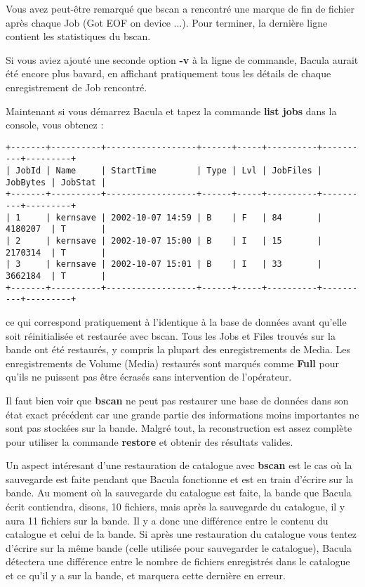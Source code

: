 Vous avez peut-être remarqué que bscan a rencontré une marque de fin de fichier
après chaque Job (Got EOF on device ...). Pour terminer, la dernière ligne 
contient les statistiques du bscan.

Si vous aviez ajouté une seconde option {\bf -v} à la ligne de commande, Bacula 
aurait été encore plus bavard, en affichant pratiquement tous les détails de
chaque enregistrement de Job rencontré.

Maintenant si vous démarrez Bacula et tapez la commande {\bf list jobs} dans la
console, vous obtenez :

\footnotesize
\begin{verbatim}
+-------+----------+------------------+------+-----+----------+----------+---------+
| JobId | Name     | StartTime        | Type | Lvl | JobFiles | JobBytes | JobStat |
+-------+----------+------------------+------+-----+----------+----------+---------+
| 1     | kernsave | 2002-10-07 14:59 | B    | F   | 84       | 4180207  | T       |
| 2     | kernsave | 2002-10-07 15:00 | B    | I   | 15       | 2170314  | T       |
| 3     | kernsave | 2002-10-07 15:01 | B    | I   | 33       | 3662184  | T       |
+-------+----------+------------------+------+-----+----------+----------+---------+
\end{verbatim}
\normalsize

ce qui correspond pratiquement à l'identique à la base de données avant qu'elle
soit réinitialisée et restaurée avec bscan. Tous les Jobs et Files trouvés sur
la bande ont été restaurés, y compris la plupart des enregistrements de Media.
Les enregistrements de Volume (Media) restaurés sont marqués comme {\bf Full}
pour qu'ils ne puissent pas être écrasés sans intervention de l'opérateur.

Il faut bien voir que {\bf bscan} ne peut pas restaurer une base de données
dans son état exact précédent car une grande partie des informations moins
importantes ne sont pas stockées sur la bande. Malgré tout, la reconstruction
est assez complète pour utiliser la commande {\bf restore} et obtenir des 
résultats valides.

Un aspect intéresant d'une restauration de catalogue avec {\bf bscan} est le cas
où la sauvegarde est faite pendant que Bacula fonctionne et est en train 
d'écrire sur la bande. Au moment où la sauvegarde du catalogue est faite, la 
bande que Bacula écrit contiendra, disons, 10 fichiers, mais après la sauvegarde
du catalogue, il y aura 11 fichiers sur la bande. Il y a donc une différence 
entre le contenu du catalogue et celui de la bande. Si après une restauration du
catalogue vous tentez d'écrire sur la même bande (celle utilisée pour 
sauvegarder le catalogue), Bacula détectera une différence entre le nombre de 
fichiers enregistrés dans le catalogue et ce qu'il y a sur la bande, et marquera
cette dernière en erreur.

